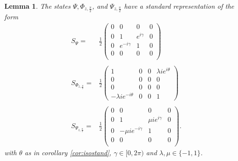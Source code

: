 \documentclass[12pt,aps,pra,showpacs,groupedaddress]{revtex4-1}
\newtheorem{lemma}{Lemma} \newtheorem{proposition}{Proposition}
\begin{document}
\begin{lemma}
  The states $\Psi, \Phi_{z, \frac{\pi} 2}$, and $\Psi_{z, \frac{\pi} 2}$ have a standard
  representation of the form
  \begin{equation}\label{phipsistand}
    \begin{array}{rl}
    S_{\Psi}=&\frac12
    \begin{pmatrix}
      0&0&0&0\\
      0&1&e^{i\gamma}&0\\
      0&e^{-i\gamma}&1&0\\
      0&0&0&0\\
    \end{pmatrix} \\ \\
   S_{\Phi_{z, \frac {\pi} 2}}=&\frac12
    \begin{pmatrix}
      1&0&0&\lambda ie^{i\theta}\\
      0&0&0&0\\
      0&0&0&0\\
      -\lambda ie^{-i\theta}&0&0&1
    \end{pmatrix} \\ \\
S_{\Psi_{z, \frac{\pi} 2}}=&\frac12
    \begin{pmatrix}
      0&0&0&0\\
      0&1&\mu ie^{i\gamma}&0\\
      0&-\mu ie^{-i\gamma}&1&0\\
      0&0&0&0\\
    \end{pmatrix}.
    \end{array}
  \end{equation}
  with $\theta$ as in corollary \ref{cor:isostand}, $\gamma \in [0, 2\pi)$ and $\lambda,\mu \in \{-1,1\}$.
\end{lemma}
\end{document}
